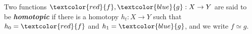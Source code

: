 \documentclass[preview]{standalone}
\begin{document}
\begin{center}
Two functions $\textcolor{red}{f},\textcolor{blue}{g} : X\to Y$ are said to be \textbf{\textit{homotopic}} if there is a homotopy $h_t : X\to Y$ such that $h_0=\textcolor{red}{f}$ and $h_1=\textcolor{blue}{g}$, and we write $f\simeq g$.
\end{center}
\end{document}
